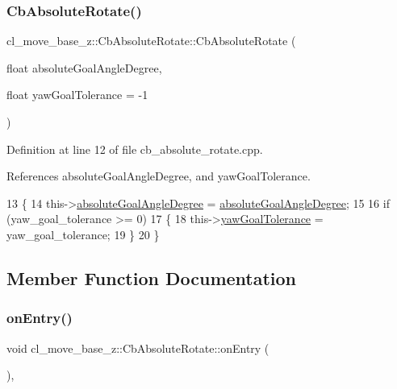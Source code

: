 \subsubsection{\texorpdfstring{Cb\+Absolute\+Rotate()}{CbAbsoluteRotate()}\hspace{0.1cm}{\footnotesize\ttfamily [2/2]}}
{\footnotesize\ttfamily cl\+\_\+move\+\_\+base\+\_\+z\+::\+Cb\+Absolute\+Rotate\+::\+Cb\+Absolute\+Rotate (\begin{DoxyParamCaption}\item[{float}]{absolute\+Goal\+Angle\+Degree,  }\item[{float}]{yaw\+Goal\+Tolerance = {\ttfamily -\/1} }\end{DoxyParamCaption})}



Definition at line 12 of file cb\+\_\+absolute\+\_\+rotate.\+cpp.



References absolute\+Goal\+Angle\+Degree, and yaw\+Goal\+Tolerance.


\begin{DoxyCode}
13 \{
14     this->\hyperlink{classcl__move__base__z_1_1CbAbsoluteRotate_ad5d0e21549940444e1cb525cda73329a}{absoluteGoalAngleDegree} = 
      \hyperlink{classcl__move__base__z_1_1CbAbsoluteRotate_ad5d0e21549940444e1cb525cda73329a}{absoluteGoalAngleDegree};
15 
16     \textcolor{keywordflow}{if} (yaw\_goal\_tolerance >= 0)
17     \{
18         this->\hyperlink{classcl__move__base__z_1_1CbAbsoluteRotate_a8d8b5b9c2c821efe101bb07c96c4bdd3}{yawGoalTolerance} = yaw\_goal\_tolerance;
19     \}
20 \}
\end{DoxyCode}


\subsection{Member Function Documentation}
\mbox{\label{classcl__move__base__z_1_1CbAbsoluteRotate_a10418ea360809fa649d295716b152b2b}} 
\subsubsection{\texorpdfstring{on\+Entry()}{onEntry()}}
{\footnotesize\ttfamily void cl\+\_\+move\+\_\+base\+\_\+z\+::\+Cb\+Absolute\+Rotate\+::on\+Entry (\begin{DoxyParamCaption}{ }\end{DoxyParamCaption})\hspace{0.3cm}{\ttfamily [override]}, {\ttfamily [virtual]}}



